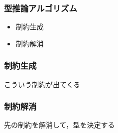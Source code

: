 \begin{frame}
  \frametitle{型推論アルゴリズム}
  \begin{itemize}
  \item 制約生成
  \item 制約解消
  \end{itemize}

\end{frame}

\begin{frame}
  \frametitle{制約生成}
  こういう制約が出てくる
\end{frame}


\begin{frame}
  \frametitle{制約解消}
  先の制約を解消して，型を決定する
\end{frame}

